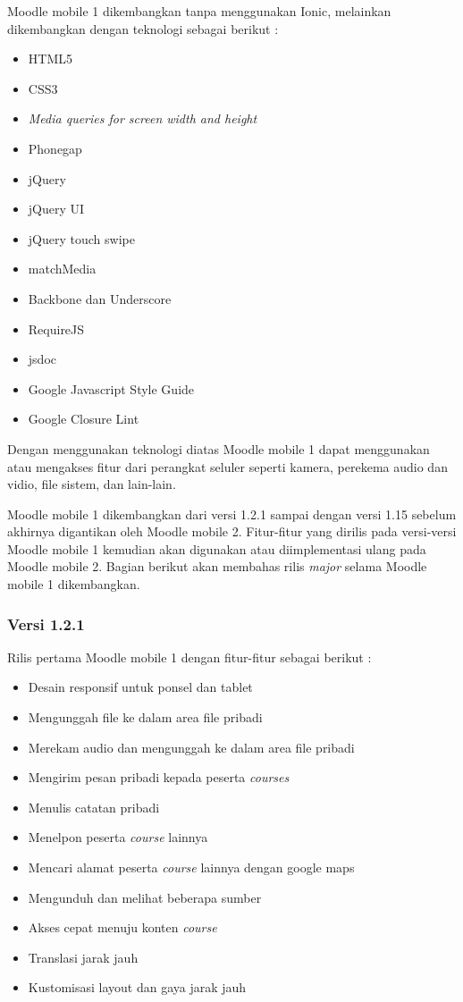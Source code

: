 Moodle mobile 1 dikembangkan tanpa menggunakan Ionic, melainkan dikembangkan dengan teknologi sebagai berikut : \cite{moodle:dev}
	\begin{itemize}
		\item HTML5
		\item CSS3
		\item \textit{Media queries for screen width and height}
		\item Phonegap
		\item jQuery
		\item jQuery UI
		\item jQuery touch swipe
		\item matchMedia
		\item Backbone dan Underscore
		\item RequireJS
		\item jsdoc
		\item Google Javascript Style Guide
		\item Google Closure Lint
	\end{itemize}
Dengan menggunakan teknologi diatas Moodle mobile 1 dapat menggunakan atau mengakses fitur dari perangkat seluler seperti kamera, perekema audio dan vidio, file sistem, dan lain-lain.

Moodle mobile 1 dikembangkan dari versi 1.2.1 sampai dengan versi 1.15 sebelum akhirnya digantikan oleh Moodle mobile 2. Fitur-fitur yang dirilis pada versi-versi Moodle mobile 1 kemudian akan digunakan atau diimplementasi ulang pada Moodle mobile 2. Bagian berikut akan membahas rilis \textit{major} selama Moodle mobile 1 dikembangkan.

\subsubsection{Versi 1.2.1 }
Rilis pertama Moodle mobile 1 dengan fitur-fitur sebagai berikut  :\cite{moodle:dev}
	\begin{itemize}
		\item Desain responsif untuk ponsel dan tablet
		\item Mengunggah file ke dalam area file pribadi
		\item Merekam audio dan mengunggah ke dalam area file pribadi
		\item Mengirim pesan pribadi kepada peserta \textit{courses}
		\item Menulis catatan pribadi
		\item Menelpon peserta \textit{course} lainnya
		\item Mencari alamat peserta \textit{course} lainnya dengan google maps
		\item Mengunduh dan melihat beberapa sumber 
		\item Akses cepat menuju konten \textit{course}
		\item Translasi jarak jauh
		\item Kustomisasi layout dan gaya jarak jauh
	\end{itemize}


